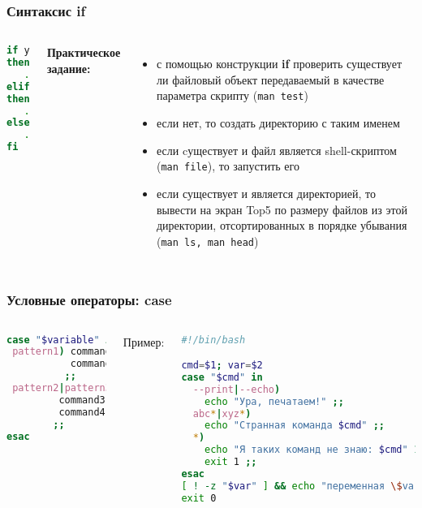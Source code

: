 
\begin{frame}[fragile]
\frametitle{Синтаксис {\bf if}}

	\begin{columns}
	
	\begin{lstlisting}[language=bash]
if условие1
then
   . . .
elif условие2
then
   . . .
else
   . . .
fi
\end{lstlisting}
	\pause
	{\bf Практическое задание:} \\
	\begin{itemize}

		\item с помощью конструкции {\bf if} проверить существует ли файловый объект передаваемый в качестве параметра скрипту ({\tt man test})
		\item если нет, то создать директорию с таким именем
		\item если cуществует и файл является shell-скриптом ({\tt man file}), то запустить его
		\item если существует и является директорией, то вывести на экран Top5 по размеру файлов из этой директории, 
		    отсортированных в порядке убывания ({\tt man ls, man head})
	\end{itemize}
	\end{columns}
\end{frame}

\begin{frame}[fragile]
\frametitle{Условные операторы: case}

	\small
	\begin{columns}
		\column{0.3\textwidth}

		\begin{lstlisting}[language=bash]
case "$variable" in 
 pattern1) command1
           command2
          ;;
 pattern2|pattern3)
         command3
         command4
        ;;
esac
\end{lstlisting}
		\pause

		\column{0.7\textwidth}
		{\normalsize Пример:}

		\begin{lstlisting}[language=bash]
#!/bin/bash

cmd=$1; var=$2
case "$cmd" in 
  --print|--echo)
    echo "Ура, печатаем!" ;;
  abc*|xyz*)
    echo "Странная команда $cmd" ;;
  *)
    echo "Я таких команд не знаю: $cmd" 1>&2
    exit 1 ;;
esac
[ ! -z "$var" ] && echo "переменная \$var=$var"
exit 0
\end{lstlisting}


	\end{columns}
\end{frame}

